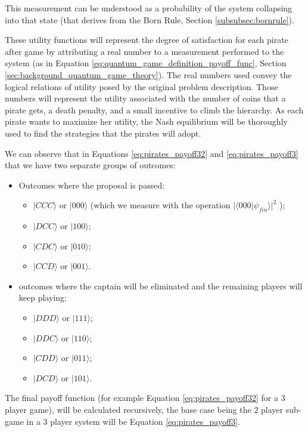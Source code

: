 This measurement can be understood as a probability of the system collapsing into that state (that derives from the Born Rule, Section \ref{subsubsec:bornrule}).


These utility functions will represent the degree of satisfaction for each pirate after game by attributing a real number to a measurement performed to the system (as in Equation \ref{eq:quantum_game_definition_payoff_func}, Section \ref{sec:background_quantum_game_theory}). 
The real numbers used convey the logical relations of utility posed by the original problem description. Those numbers will represent the utility associated with the number of coins that a pirate gets, a death penalty, and a small incentive to climb the hierarchy. As each pirate wants to maximize her utility, the Nash equilibrium will be thoroughly used to find the strategies that the pirates will adopt\cite{nash50}\cite{Nash51}.




We can observe that in Equations \ref{eq:pirates_payoff32} and \ref{eq:pirates_payoff3} that we have two separate groups of outcomes: 
\begin{itemize}
\item Outcomes where the proposal is passed:
\begin{itemize}
\item $\vert CCC\rangle$ or $\vert000\rangle$ (which we measure with the operation $\vert\langle000\vert\psi_{fin}\rangle\vert^{2}$ );
\item $\vert DCC\rangle$ or $\vert100\rangle$;
\item $\vert CDC\rangle$ or $\vert010\rangle$;
\item $\vert CCD\rangle$ or $\vert001\rangle$.
\end{itemize}
\item outcomes where the captain will be eliminated and the remaining players will keep playing:
\begin{itemize}
\item $\vert DDD\rangle$ or $\vert111\rangle$;
\item $\vert DDC\rangle$ or $\vert110\rangle$;
\item $\vert CDD\rangle$ or $\vert011\rangle$;
\item $\vert DCD\rangle$ or $\vert101\rangle$.
\end{itemize}
\end{itemize}



The final payoff function (for example Equation \ref{eq:pirates_payoff32} for a $3$ player game), will be calculated recursively, the base case being the $2$ player sub-game in a $3$ player system will be Equation \ref{eq:pirates_payoff3}.

